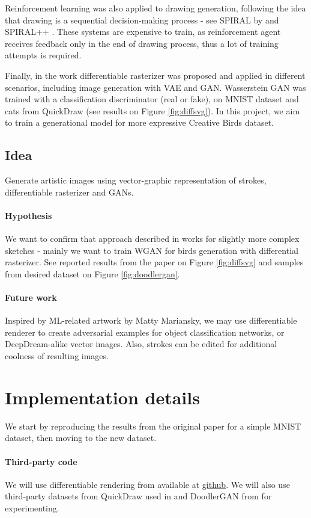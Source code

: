 \documentclass{article}
\begin{document}
Reinforcement learning was also applied to drawing generation, following the idea that drawing is a sequential decision-making process - see SPIRAL by \cite{ganin2018synthesizing} and SPIRAL++ \cite{mellor2019unsupervised}. These systems are expensive to train, as reinforcement agent receives feedback only in the end of drawing process, thus a lot of training attempts is required. 

Finally, in the work \cite{diffsvg} differentiable rasterizer was proposed and applied in different scenarios, including image generation with VAE and GAN. Wasserstein GAN was trained with a classification discriminator (real or fake), on MNIST dataset and cats from QuickDraw (see results on Figure \ref{fig:diffsvg}). In this project, we aim to train a generational model for more expressive Creative Birds dataset.

\subsection{Idea}
Generate artistic images using vector-graphic representation of strokes, differentiable rasterizer and GANs.

\paragraph{Hypothesis} We want to confirm that approach described in \cite{diffsvg} works for slightly more complex sketches - mainly we want to train WGAN for birds generation with differential rasterizer. See reported results from the paper on Figure \ref{fig:diffsvg} and samples from desired dataset on Figure \ref{fig:doodlergan}.

\paragraph{Future work} Inspired by ML-related artwork by Matty Mariansky, we may use differentiable renderer to create adversarial examples for object classification networks, or DeepDream-alike vector images. Also, strokes can be edited for additional coolness of resulting images. 

\section{Implementation details}
We start by reproducing the results from the original paper for a simple MNIST dataset, then moving to the new dataset.

\paragraph{Third-party code} We will use differentiable rendering from \cite{diffsvg} available at \href{https://github.com/BachiLi/diffvg}{github}. We will also use third-party datasets from QuickDraw used in \cite{sketchrnn} and DoodlerGAN from \cite{doodlergan} for experimenting.
\end{document}
